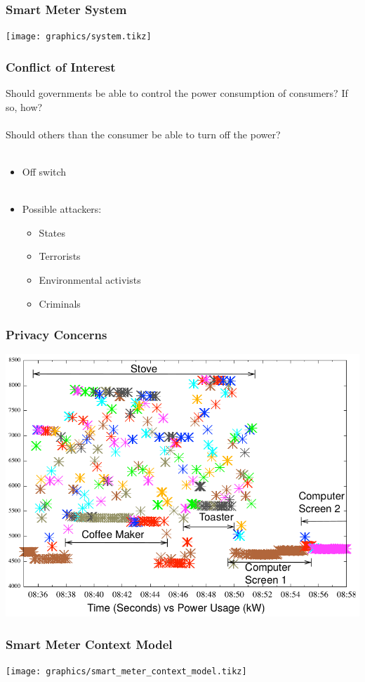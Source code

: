 \begin{frame}
  \frametitle{Smart Meter System}
  \texttt{[image: graphics/system.tikz]}
\end{frame}


\begin{frame}
  \frametitle{Conflict of Interest}
  Should governments be able to control the power consumption of consumers? If so, how?
  \\~\\
  Should others than the consumer be able to turn off the power?
  \\~\\
  \begin{itemize}
  \item Off switch
    \\~\\
  \item Possible attackers:
    \begin{itemize}
    \item States
    \item Terrorists
    \item Environmental activists
    \item Criminals
    \end{itemize}
  \end{itemize}
\end{frame}
\begin{frame}
  \frametitle{Privacy Concerns}
  \includegraphics[width=.8\textwidth]{graphics/detailed.png}
\end{frame}

\begin{frame}
  \frametitle{Smart Meter Context Model}
  \texttt{[image: graphics/smart\_meter\_context\_model.tikz]}
\end{frame}
